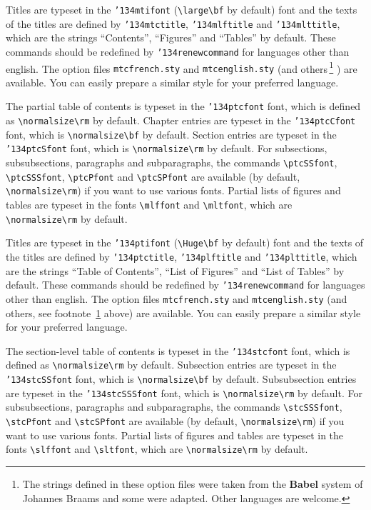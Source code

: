 \documentclass[12pt,a4paper]{book}
\def\bs{{\tt\char'134}}
\begin{document}
Titles are typeset in the {\tt\bs mtifont} (\verb|\large\bf| by
default) font and the texts of the titles are defined by
{\tt\bs mtctitle}, {\tt\bs mlftitle} and {\tt\bs mlttitle}, which
are the strings ``Contents'', ``Figures'' and ``Tables'' by default.
These commands should be redefined by {\tt\bs renewcommand} for
languages other than english. The option files
{\tt mtcfrench.sty} and {\tt mtcenglish.sty}
(and others\,\footnote{The strings defined in
             these option files were taken from the {\bf Babel}
             system of Johannes Braams and some were
             adapted. Other languages are welcome.\label{fo+lang}}%
) are available.
You can easily prepare a similar style for your preferred language.

The partial table of contents
is typeset in the {\tt\bs ptcfont}
font, which is defined as \verb|\normalsize\rm| by default.
Chapter entries are typeset in the {\tt\bs ptcCfont} font,
which is \verb|\normalsize\bf| by default.
Section entries are typeset in the {\tt\bs ptcSfont} font,
which is \verb|\normalsize\rm| by default.
For subsections, subsubsections, paragraphs and subparagraphs, the
commands \verb|\ptcSSfont|, \verb|\ptcSSSfont|, \verb|\ptcPfont| and
\verb|\ptcSPfont| are available (by default, \verb|\normalsize\rm|) if you
want to use various fonts. Partial lists of figures and tables are
typeset in the fonts \verb|\mlffont| and \verb|\mltfont|, which are
\verb|\normalsize\rm| by default.

Titles are typeset in the {\tt\bs ptifont} (\verb|\Huge\bf| by
default) font and the texts of the titles are defined by
{\tt\bs ptctitle}, {\tt\bs plftitle} and {\tt\bs plttitle}, which
are the strings ``Table of Contents'',
``List of Figures'' and ``List of Tables'' by default.
These commands should be redefined by {\tt\bs renewcommand} for
languages other than english.
The option files
{\tt mtcfrench.sty} and {\tt mtcenglish.sty} (and others, see
footnote~\ref{fo+lang} above) are available.
You can easily prepare a similar style for your preferred language.

The section-level table of contents
is typeset in the {\tt\bs stcfont}
font, which is defined as \verb|\normalsize\rm| by default.
Subsection entries are typeset in the {\tt\bs stcSSfont} font,
which is \verb|\normalsize\bf| by default.
Subsubsection entries are typeset in the {\tt\bs stcSSSfont} font,
which is \verb|\normalsize\rm| by default.
For subsubsections, paragraphs and subparagraphs, the
commands \verb|\stcSSSfont|, \verb|\stcPfont| and
\verb|\stcSPfont| are available (by default, \verb|\normalsize\rm|) if you
want to use various fonts. Partial lists of figures and tables are
typeset in the fonts \verb|\slffont| and \verb|\sltfont|, which are
\verb|\normalsize\rm| by default.
\end{document}
